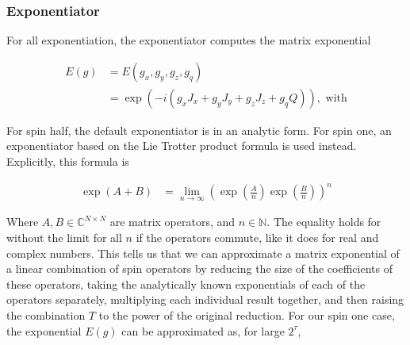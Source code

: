 \documentclass{jors}
\begin{document}
		\subsubsection*{Exponentiator}
			For all exponentiation, the exponentiator computes the matrix exponential
			
			\begin{align}
				E(g) &= E(g_x, g_y, g_z, g_q)\\
				&= \exp(-i (g_x J_x + g_y J_y + g_z J_z + g_q Q)), \textrm{ with}
			\end{align}
			
			For spin half, the default exponentiator is in an analytic form. For spin one, an exponentiator based on the Lie Trotter product formula \cite{moler_nineteen_2003} is used instead. Explicitly, this formula is
			
			\begin{align}
				\exp\left( A + B\right) &= \lim_{n\to\infty} \left(\exp\left(\frac{A}{n}\right) \exp\left(\frac{B}{n}\right)\right)^n
			\end{align}
			
			Where \(A,B\in\mathbb{C}^{N\times N}\) are matrix operators, and \(n\in\mathbb{N}\). The equality holds for without the limit for all \(n\) if the operators commute, like it does for real and complex numbers. This tells us that we can approximate a matrix exponential of a linear combination of spin operators by reducing the size of the coefficients of these operators, taking the analytically known exponentials of each of the operators separately, multiplying each individual result together, and then raising the combination \(T\) to the power of the original reduction. For our spin one case, the exponential \(E(g)\) can be approximated as, for large \(2^\tau\),

\end{document}
